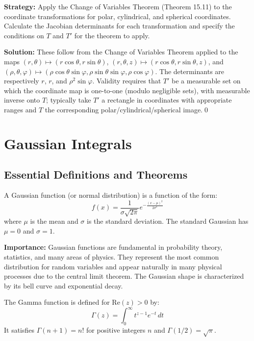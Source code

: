 \noindent\textbf{Strategy:} Apply the Change of Variables Theorem (Theorem 15.11) to the coordinate transformations for polar, cylindrical, and spherical coordinates. Calculate the Jacobian determinants for each transformation and specify the conditions on \(T\) and \(T'\) for the theorem to apply.

\bigskip\noindent\textbf{Solution:}
These follow from the Change of Variables Theorem applied to the maps
\( (r,\theta)\mapsto (r\cos\theta, r\sin\theta) \),
\( (r,\theta,z)\mapsto (r\cos\theta, r\sin\theta, z) \), and
\( (\rho,\theta,\varphi)\mapsto (\rho\cos\theta\sin\varphi,\rho\sin\theta\sin\varphi,\rho\cos\varphi) \).
The determinants are respectively \(r\), \(r\), and \(\rho^2\sin\varphi\). Validity requires that \(T'\) be a measurable set on which the coordinate map is one-to-one (modulo negligible sets), with measurable inverse onto \(T\); typically take \(T'\) a rectangle in coordinates with appropriate ranges and \(T\) the corresponding polar/cylindrical/spherical image.\qed
\section{Gaussian Integrals}

\subsection*{Essential Definitions and Theorems}

\begin{definition}
A Gaussian function (or normal distribution) is a function of the form:
\[f(x) = \frac{1}{\sigma\sqrt{2\pi}} e^{-\frac{(x-\mu)^2}{2\sigma^2}}\]
where $\mu$ is the mean and $\sigma$ is the standard deviation. The standard Gaussian has $\mu = 0$ and $\sigma = 1$.
\end{definition}

\noindent\textbf{Importance:} Gaussian functions are fundamental in probability theory, statistics, and many areas of physics. They represent the most common distribution for random variables and appear naturally in many physical processes due to the central limit theorem. The Gaussian shape is characterized by its bell curve and exponential decay.



\begin{definition}
The Gamma function is defined for $\text{Re}(z) > 0$ by:
\[\Gamma(z) = \int_0^{\infty} t^{z-1} e^{-t} \, dt\]
It satisfies $\Gamma(n+1) = n!$ for positive integers $n$ and $\Gamma(1/2) = \sqrt{\pi}$.
\end{definition}

